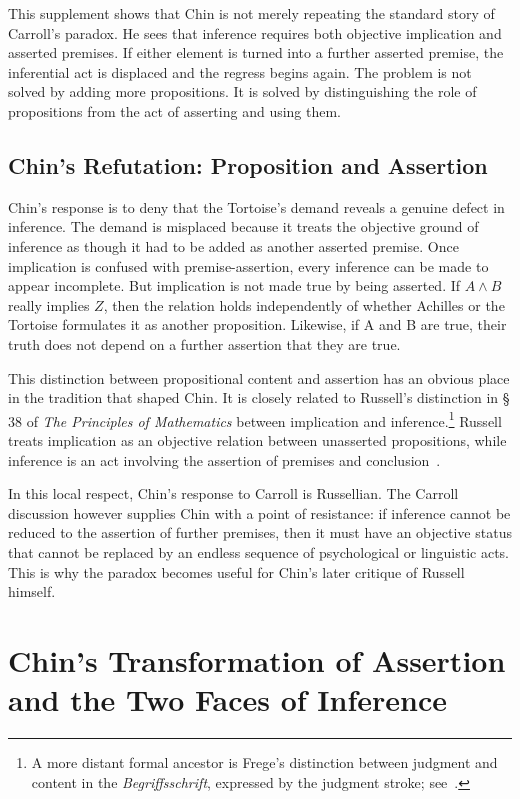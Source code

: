 \documentclass{birkjour}
\begin{document}
This supplement shows that Chin is not merely repeating the standard story of Carroll's paradox. He sees that inference requires both objective implication and asserted premises. If either element is turned into a further asserted premise, the inferential act is displaced and the regress begins again. The problem is not solved by adding more propositions. It is solved by distinguishing the role of propositions from the act of asserting and using them.

\subsection{Chin's Refutation: Proposition and Assertion}

Chin's response is to deny that the Tortoise's demand reveals a genuine defect in inference. The demand is misplaced because it treats the objective ground of inference as though it had to be added as another asserted premise. Once implication is confused with premise-assertion, every inference can be made to appear incomplete. But implication is not made true by being asserted. If $A \wedge B$ really implies $Z$, then the relation holds independently of whether Achilles or the Tortoise formulates it as another proposition. Likewise, if A and B are true, their truth does not depend on a further assertion that they are true.

This distinction between propositional content and assertion has an obvious place in the tradition that shaped Chin. It is closely related to Russell's distinction in \S\,38 of \textit{The Principles of Mathematics} between implication and inference.\footnote{A more distant formal ancestor is Frege's distinction between judgment and content in the \textit{Begriffsschrift}, expressed by the judgment stroke; see~\cite{vanderSchaar2013}.} Russell treats implication as an objective relation between unasserted propositions, while inference is an act involving the assertion of premises and conclusion~\cite[\S\,38]{Russell1903}. 

In this local respect, Chin's response to Carroll is Russellian. The Carroll discussion however supplies Chin with a point of resistance: if inference cannot be reduced to the assertion of further premises, then it must have an objective status that cannot be replaced by an endless sequence of psychological or linguistic acts. This is why the paradox becomes useful for Chin's later critique of Russell himself.

\section{Chin's Transformation of Assertion and the Two Faces of Inference}
\label{sec:assertion-two-faces}
\end{document}
